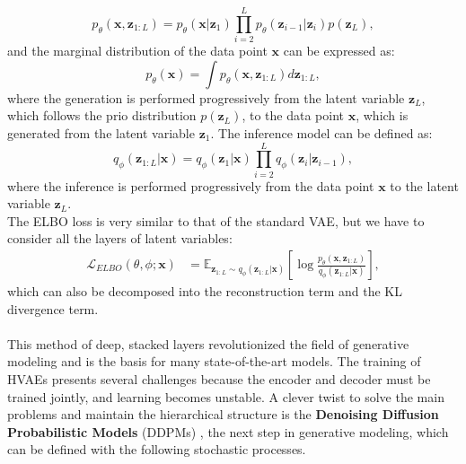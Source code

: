 \begin{equation}
    p_{\theta}(\mathbf{x},\mathbf{z}_{1:L}) = p_{\theta}(\mathbf{x}|\mathbf{z}_1)\prod_{i=2}^{L} p_{\theta}(\mathbf{z}_{i-1}|\mathbf{z}_i)p(\mathbf{z}_L),
\end{equation}
and the marginal distribution of the data point $\mathbf{x}$ can be expressed as:
\begin{equation}
    p_{\theta}(\mathbf{x}) = \int p_{\theta}(\mathbf{x},\mathbf{z}_{1:L})d\mathbf{z}_{1:L},
\end{equation}
where the generation is performed progressively from the latent variable $\mathbf{z}_L$, which follows the prio distribution $p(\mathbf{z}_L)$, to the data point $\mathbf{x}$, which is generated from the latent variable $\mathbf{z}_1$.
The inference model can be defined as: 
\begin{equation}
    q_{\phi}(\mathbf{z}_{1:L}|\mathbf{x}) = q_{\phi}(\mathbf{z}_1|\mathbf{x})\prod_{i=2}^{L} q_{\phi}(\mathbf{z}_i|\mathbf{z}_{i-1}),
\end{equation}
where the inference is performed progressively from the data point $\mathbf{x}$ to the latent variable $\mathbf{z}_L$. \\
The ELBO loss is very similar to that of the standard VAE, but we have to consider all the layers of latent variables:
\begin{align}
    \mathcal{L}_{ELBO}(\theta, \phi; \mathbf{x}) &= \mathbb{E}_{\mathbf{z}_{1:L}\sim q_{\phi}(\mathbf{z}_{1:L}|\mathbf{x})} \left[\log \frac{p_{\theta}(\mathbf{x},\mathbf{z}_{1:L})}{q_{\phi}(\mathbf{z}_{1:L}|\mathbf{x})} \right],
\end{align}
which can also be decomposed into the reconstruction term and the KL divergence term. \\
\\
This method of deep, stacked layers revolutionized the field of generative modeling and is the basis for many state-of-the-art models. The training of HVAEs presents several challenges because the encoder 
and decoder must be trained jointly, and learning becomes unstable. A clever twist to solve the main problems and maintain the hierarchical structure is the \textbf{Denoising Diffusion Probabilistic Models} (DDPMs)
\cite{sohldickstein2015deepunsupervisedlearningusing, ho2020denoisingdiffusionprobabilisticmodels}, the next step in generative modeling, which can be defined with the following stochastic processes. 

